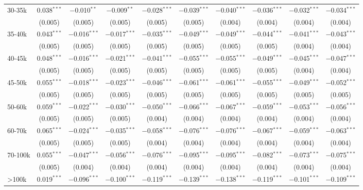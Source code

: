 \begin{table}[!htbp]
\begin{tabular}{@{\extracolsep{5pt}}lccccccccc}
  30-35k & 0.038$^{***}$ & $-$0.010$^{**}$ & $-$0.009$^{**}$ & $-$0.028$^{***}$ & $-$0.039$^{***}$ & $-$0.040$^{***}$ & $-$0.036$^{***}$ & $-$0.032$^{***}$ & $-$0.034$^{***}$ \\ 
  & (0.005) & (0.005) & (0.005) & (0.005) & (0.005) & (0.004) & (0.004) & (0.004) & (0.004) \\ 
  35-40k & 0.043$^{***}$ & $-$0.016$^{***}$ & $-$0.017$^{***}$ & $-$0.035$^{***}$ & $-$0.049$^{***}$ & $-$0.049$^{***}$ & $-$0.044$^{***}$ & $-$0.041$^{***}$ & $-$0.043$^{***}$ \\ 
  & (0.005) & (0.005) & (0.005) & (0.005) & (0.005) & (0.005) & (0.005) & (0.004) & (0.004) \\ 
  40-45k & 0.048$^{***}$ & $-$0.016$^{***}$ & $-$0.021$^{***}$ & $-$0.041$^{***}$ & $-$0.055$^{***}$ & $-$0.055$^{***}$ & $-$0.049$^{***}$ & $-$0.045$^{***}$ & $-$0.047$^{***}$ \\ 
  & (0.005) & (0.005) & (0.005) & (0.005) & (0.005) & (0.005) & (0.005) & (0.004) & (0.004) \\ 
  45-50k & 0.055$^{***}$ & $-$0.018$^{***}$ & $-$0.023$^{***}$ & $-$0.046$^{***}$ & $-$0.061$^{***}$ & $-$0.061$^{***}$ & $-$0.055$^{***}$ & $-$0.049$^{***}$ & $-$0.052$^{***}$ \\ 
  & (0.005) & (0.005) & (0.005) & (0.005) & (0.005) & (0.005) & (0.005) & (0.005) & (0.005) \\ 
  50-60k & 0.059$^{***}$ & $-$0.022$^{***}$ & $-$0.030$^{***}$ & $-$0.050$^{***}$ & $-$0.066$^{***}$ & $-$0.067$^{***}$ & $-$0.059$^{***}$ & $-$0.053$^{***}$ & $-$0.056$^{***}$ \\ 
  & (0.005) & (0.005) & (0.005) & (0.004) & (0.004) & (0.004) & (0.004) & (0.004) & (0.004) \\ 
  60-70k & 0.065$^{***}$ & $-$0.024$^{***}$ & $-$0.035$^{***}$ & $-$0.058$^{***}$ & $-$0.076$^{***}$ & $-$0.076$^{***}$ & $-$0.067$^{***}$ & $-$0.059$^{***}$ & $-$0.063$^{***}$ \\ 
  & (0.005) & (0.005) & (0.005) & (0.004) & (0.004) & (0.004) & (0.004) & (0.004) & (0.004) \\ 
  70-100k & 0.055$^{***}$ & $-$0.047$^{***}$ & $-$0.056$^{***}$ & $-$0.076$^{***}$ & $-$0.095$^{***}$ & $-$0.095$^{***}$ & $-$0.082$^{***}$ & $-$0.073$^{***}$ & $-$0.075$^{***}$ \\ 
  & (0.005) & (0.004) & (0.004) & (0.004) & (0.004) & (0.004) & (0.004) & (0.004) & (0.004) \\ 
  >100k & 0.019$^{***}$ & $-$0.096$^{***}$ & $-$0.100$^{***}$ & $-$0.119$^{***}$ & $-$0.139$^{***}$ & $-$0.138$^{***}$ & $-$0.119$^{***}$ & $-$0.101$^{***}$ & $-$0.109$^{***}$ \\ 

\end{tabular}
\end{table}
